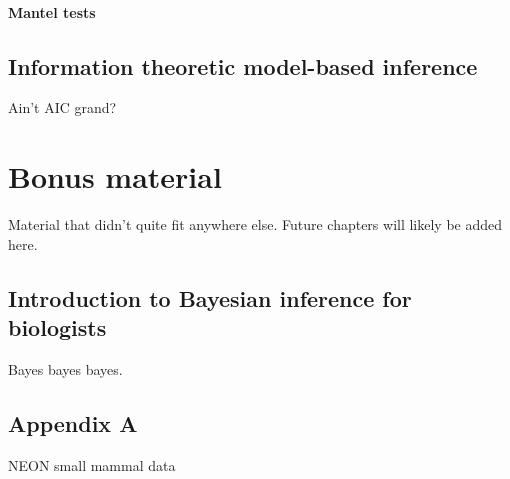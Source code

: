 \documentclass[
  13,
  letterpaper,
]{report}
\begin{document}
\subsection{Mantel tests}\label{sec-mtest-dis-mantel}

\chapter{Information theoretic model-based inference}\label{sec-it}

Ain't AIC grand?

\part{Bonus material}

Material that didn't quite fit anywhere else. Future chapters will
likely be added here.

\chapter{Introduction to Bayesian inference for
biologists}\label{sec-bayes}

Bayes bayes bayes.

\cleardoublepage
{}
{}
\appendix

\chapter{Appendix A}\label{sec-appenda}

NEON small mammal data
\end{document}
